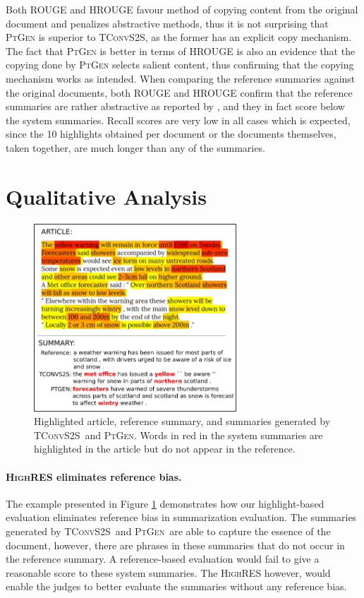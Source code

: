 \documentclass[11pt,a4paper]{article}
\newcommand\highres{\textsc{HighRES}}
\newcommand\ptgen{\textsc{PtGen}}
\newcommand\tconv{\textsc{TConvS2S}}
\newcommand\hrouge{\textsc{HROUGE}}
\newcommand\rouge{\textsc{ROUGE}}
\begin{document}
Both \rouge{} and \hrouge{} favour method of copying content from the original document and penalizes abstractive methods, thus it is not surprising that \ptgen{} is superior to \tconv{}, as the former has an explicit copy mechanism. The fact that \ptgen{} is better in terms of \hrouge{} is also an evidence that the copying done by \ptgen{} selects salient content, thus confirming that the copying mechanism works as intended. 
When comparing the reference summaries against the original documents, both \rouge{} and \hrouge{} confirm that the reference summaries are rather abstractive as reported by \citet{narayan18xsum}, and they in fact score below the system summaries. Recall scores are very low in all cases which is expected, since the 10 highlights obtained per document or the documents themselves, taken together, are much longer than any of the summaries.

\section{Qualitative Analysis}
\label{sec:qanalysis}

\begin{figure}[t!]
    \centering
    \includegraphics[width=7.6cm]{heatmap_summ_small_2}
    \caption{Highlighted article, reference summary, and summaries generated by \tconv\ and \ptgen. Words in red in the system summaries are highlighted in the article but do not appear in the reference.}
  \label{image:heatmap_small_2}
\end{figure}

\paragraph{\highres{} eliminates reference bias.}
The example presented in Figure \ref{image:heatmap_small_2} demonstrates how our highlight-based evaluation eliminates reference bias in summarization evaluation. The summaries generated by \tconv\ and \ptgen\ are able to capture the essence of the document, however, there are phrases in these summaries that do not occur in the reference summary. A reference-based evaluation would fail to give a reasonable score to these system summaries. The \highres{} however, would enable the judges to better evaluate the summaries without any reference bias.
\end{document}

